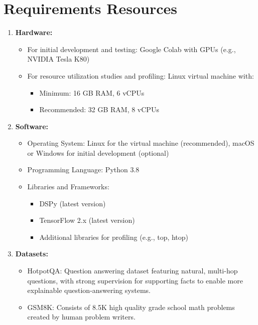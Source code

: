 \chapter{Requirements Resources}

\begin{enumerate}
    \item \textbf{Hardware:}
    \begin{itemize}
        \item For initial development and testing: Google Colab with GPUs (e.g., NVIDIA Tesla K80)
        \item For resource utilization studies and profiling: Linux virtual machine with:
            \begin{itemize}
                \item Minimum: 16 GB RAM, 6 vCPUs
                \item Recommended: 32 GB RAM, 8 vCPUs
            \end{itemize}
    \end{itemize}
    \item \textbf{Software:}
    \begin{itemize}
        \item Operating System: Linux for the virtual machine (recommended), macOS or Windows for initial development (optional)
        \item Programming Language: Python 3.8
        \item Libraries and Frameworks:
            \begin{itemize}
                \item DSPy (latest version)
                \item TensorFlow 2.x (latest version)
                \item Additional libraries for profiling (e.g., top, htop)
            \end{itemize}
    \end{itemize}
    \item \textbf{Datasets:}
    \begin{itemize}
    \item HotpotQA: Question answering dataset featuring natural, multi-hop questions, with strong supervision for supporting facts to enable more explainable question-answering systems.
    \item GSM8K: Consists of 8.5K high quality grade school math problems created by human problem writers.
    \end{itemize}
\end{enumerate}

